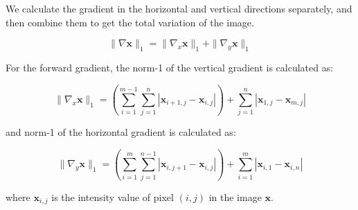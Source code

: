 \documentclass[12pt]{article}
\begin{document}
We calculate the gradient in the horizontal and vertical directions separately, and then combine them to get the total variation of the image. 

\begin{equation}
  \| \nabla \mathbf{x} \|_1 = \| \nabla_x \mathbf{x} \|_1 + \| \nabla_y \mathbf{x} \|_1
\end{equation}




For the forward gradient, the norm-1 of the vertical gradient is calculated as:

\begin{equation}
  \| \nabla_x \mathbf{x} \|_1 = \left( \sum_{i=1}^{m-1} \sum_{j=1}^{n} |\mathbf{x}_{i+1,j} - \mathbf{x}_{i,j}| \right) + \sum_{j=1}^{n} |\mathbf{x}_{1, j} - \mathbf{x}_{m,j}|
\end{equation}

and norm-1 of the horizontal gradient is calculated as:

\begin{equation}
  \| \nabla_y \mathbf{x} \|_1 = \left( \sum_{i=1}^{m} \sum_{j=1}^{n-1} |\mathbf{x}_{i,j+1} - \mathbf{x}_{i,j}| \right) + \sum_{i=1}^{m} |\mathbf{x}_{i, 1} - \mathbf{x}_{i,n}|
\end{equation}




where $\mathbf{x}_{i,j}$ is the intensity value of pixel $(i,j)$ in the image $\mathbf{x}$. 
\end{document}
